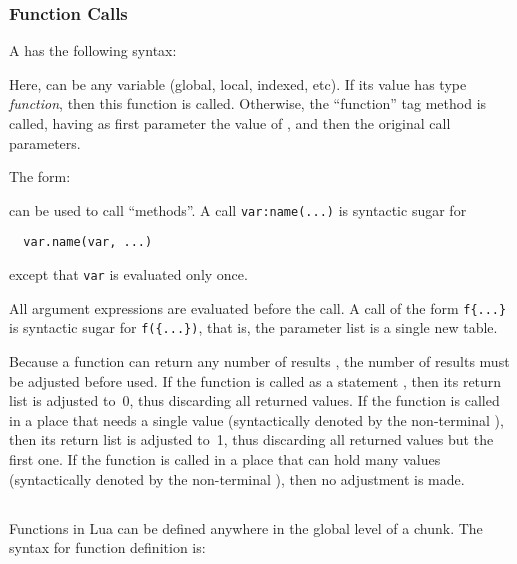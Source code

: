 \subsubsection{Function Calls}  \label{functioncall}
A  has the following syntax:
\begin{Produc}
\end{Produc}%
Here,  can be any variable (global, local, indexed, etc).
If its value has type \emph{function},
then this function is called.
Otherwise, the ``function'' tag method is called,
having as first parameter the value of ,
and then the original call parameters.

The form:
\begin{Produc}
\end{Produc}%
can be used to call ``methods''.
A call \verb|var:name(...)|
is syntactic sugar for
\begin{verbatim}
  var.name(var, ...)
\end{verbatim}
except that \verb|var| is evaluated only once.

\begin{Produc}
\end{Produc}%
All argument expressions are evaluated before the call.
A call of the form \verb|f{...}| is syntactic sugar for
\verb|f({...})|, that is,
the parameter list is a single new table.

Because a function can return any number of results
,
the number of results must be adjusted before used.
If the function is called as a statement ,
then its return list is adjusted to~0,
thus discarding all returned values.
If the function is called in a place that needs a single value
(syntactically denoted by the non-terminal ),
then its return list is adjusted to~1,
thus discarding all returned values but the first one.
If the function is called in a place that can hold many values
(syntactically denoted by the non-terminal ),
then no adjustment is made.


\subsection{} \label{func-def}

Functions in Lua can be defined anywhere in the global level of a chunk.
The syntax for function definition is:
\begin{Produc}
\end{Produc}


